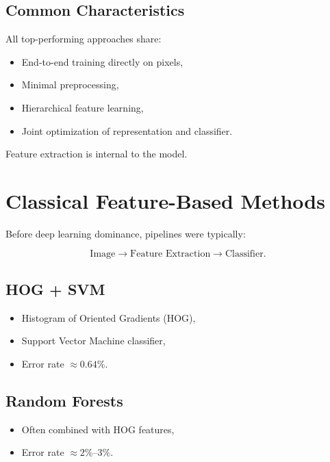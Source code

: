 \documentclass[11pt]{article}
\begin{document}
\subsection{Common Characteristics}

All top-performing approaches share:

\begin{itemize}
    \item End-to-end training directly on pixels,
    \item Minimal preprocessing,
    \item Hierarchical feature learning,
    \item Joint optimization of representation and classifier.
\end{itemize}

Feature extraction is internal to the model.

\section{Classical Feature-Based Methods}

Before deep learning dominance, pipelines were typically:

\[
\text{Image} \rightarrow \text{Feature Extraction} \rightarrow \text{Classifier}.
\]

\subsection{HOG + SVM}

\begin{itemize}
    \item Histogram of Oriented Gradients (HOG),
    \item Support Vector Machine classifier,
    \item Error rate $\approx 0.64\%$.
\end{itemize}

\subsection{Random Forests}

\begin{itemize}
    \item Often combined with HOG features,
    \item Error rate $\approx 2\%$--$3\%$.
\end{itemize}
\end{document}
